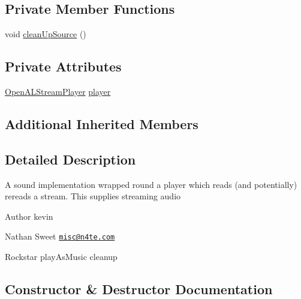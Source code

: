 \subsection*{Private Member Functions}
\begin{DoxyCompactItemize}
\item 
void \mbox{\hyperlink{classorg_1_1newdawn_1_1slick_1_1openal_1_1_stream_sound_aa5c0c9541188f59c8786852419f9c7c2}{clean\+Up\+Source}} ()
\end{DoxyCompactItemize}
\subsection*{Private Attributes}
\begin{DoxyCompactItemize}
\item 
\mbox{\hyperlink{classorg_1_1newdawn_1_1slick_1_1openal_1_1_open_a_l_stream_player}{Open\+A\+L\+Stream\+Player}} \mbox{\hyperlink{classorg_1_1newdawn_1_1slick_1_1openal_1_1_stream_sound_a5e4d0d6e22af804ce94996f6ab90872f}{player}}
\end{DoxyCompactItemize}
\subsection*{Additional Inherited Members}


\subsection{Detailed Description}
A sound implementation wrapped round a player which reads (and potentially) rereads a stream. This supplies streaming audio

\begin{DoxyAuthor}{Author}
kevin 

Nathan Sweet \href{mailto:misc@n4te.com}{\tt misc@n4te.\+com} 

Rockstar play\+As\+Music cleanup 
\end{DoxyAuthor}


\subsection{Constructor \& Destructor Documentation}
\mbox{\label{classorg_1_1newdawn_1_1slick_1_1openal_1_1_stream_sound_af8a1307e584f0d319ff61b3b1bd40edb}} 
